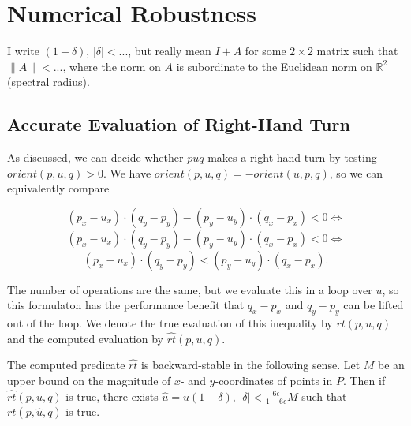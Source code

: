 \section{Numerical Robustness}



I write $(1 + \delta)$, $|\delta| < ...$, but really mean $I + A$ for some 
$2 \times 2$ matrix such that $\lVert A \rVert < ...$, where the norm
on $A$ is subordinate to the Euclidean norm on $\mathbb{R}^2$ (spectral radius).


\subsection{Accurate Evaluation of Right-Hand Turn}

As discussed, we can decide whether $puq$ makes a right-hand turn by testing
$orient(p, u, q) > 0$. We have $orient(p, u, q) = -orient(u, p, q)$, so
we can equivalently compare

$$(p_x - u_x) \cdot (q_y - p_y) - (p_y - u_y) \cdot (q_x - p_x) < 0 \iff$$
$$(p_x - u_x) \cdot (q_y - p_y) - (p_y - u_y) \cdot (q_x - p_x) < 0 \iff$$
$$(p_x - u_x) \cdot (q_y - p_y) < (p_y - u_y) \cdot (q_x - p_x).$$

The number of operations are the same, but we evaluate this in a loop over $u$, 
so this formulaton has the performance benefit that $q_x - p_x$ and $q_y - p_y$ 
can be lifted out of the loop. We denote the true evaluation of this inequality
by $rt(p, u, q)$ and the computed evaluation by $\widehat{rt}(p, u, q)$.


\begin{lemma}\label{lem:right-turn}
    The computed predicate $\widehat{rt}$ is backward-stable in the 
    following sense. Let $M$ be
    an upper bound on the magnitude of $x$- and $y$-coordinates of points in
    $P$. Then if $\widehat{rt}(p, u, q)$ is true, there exists 
    $\hat{u} = u(1 + \delta)$, $|\delta| < \frac{6\epsilon}{1 - 6\epsilon}M$
    such that $rt(p, \hat{u}, q)$ is true.
\end{lemma}

